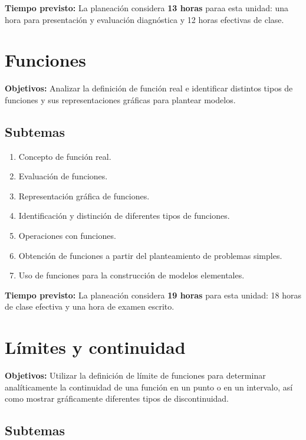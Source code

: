\documentclass[12pt]{article}
\begin{document}
\textbf{Tiempo previsto:} La planeaci\'on considera \textbf{13 horas} paraa esta unidad: una hora para presentación y evaluación diagnóstica y 12 horas efectivas de clase.

\section{Funciones}

\textbf{Objetivos:}  Analizar la definición de función real e identificar distintos tipos de funciones y sus representaciones gráficas para plantear modelos.

\subsection{Subtemas}

\begin{enumerate}
    \item Concepto de función real.
    \item Evaluación de funciones.
    \item Representación gráfica de funciones.
    \item Identificación y distinción de diferentes tipos de funciones.
    \item Operaciones con funciones.
    \item Obtención de funciones a partir del planteamiento de problemas simples.
    \item Uso de funciones para la construcción de modelos elementales.
\end{enumerate}

\textbf{Tiempo previsto:} La planeaci\'on considera \textbf{19 horas} para esta unidad: 18 horas de clase efectiva y una hora de examen escrito.

\section{Límites y continuidad}

\textbf{Objetivos:} Utilizar la definición de límite de funciones para determinar analíticamente la continuidad de una función en un punto o en un intervalo, así como mostrar gráficamente diferentes tipos de discontinuidad.

\subsection{Subtemas}
\end{document}
